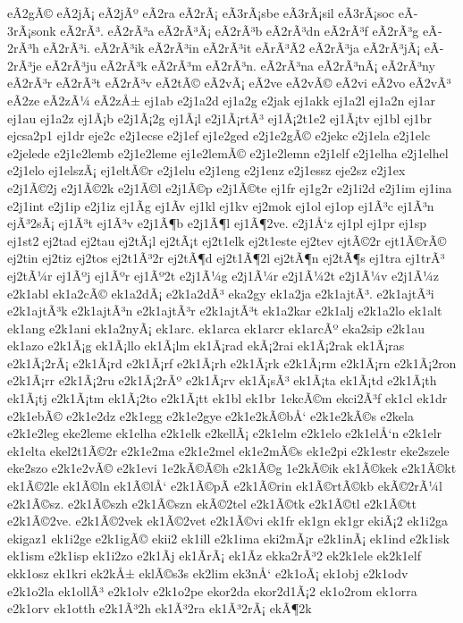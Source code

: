 {eÃ­2gÃ©
eÃ­2jÃ¡
eÃ­2jÃº
eÃ­2ra
eÃ­2rÃ¡
eÃ­3rÃ¡sbe
eÃ­3rÃ¡sil
eÃ­3rÃ¡soc
eÃ­3rÃ¡sonk
eÃ­2rÃ³.
eÃ­2rÃ³a
eÃ­2rÃ³Ã¡
eÃ­2rÃ³b
eÃ­2rÃ³dn
eÃ­2rÃ³f
eÃ­2rÃ³g
eÃ­2rÃ³h
eÃ­2rÃ³i.
eÃ­2rÃ³ik
eÃ­2rÃ³in
eÃ­2rÃ³it
eÃ­rÃ³Ã­2
eÃ­2rÃ³ja
eÃ­2rÃ³jÃ¡
eÃ­2rÃ³je
eÃ­2rÃ³ju
eÃ­2rÃ³k
eÃ­2rÃ³m
eÃ­2rÃ³n.
eÃ­2rÃ³na
eÃ­2rÃ³nÃ¡
eÃ­2rÃ³ny
eÃ­2rÃ³r
eÃ­2rÃ³t
eÃ­2rÃ³v
eÃ­2tÃ©
eÃ­2vÃ¡
eÃ­2ve
eÃ­2vÃ©
eÃ­2vi
eÃ­2vo
eÃ­2vÃ³
eÃ­2ze
eÃ­2zÃ¼
eÃ­2zÅ±
ej1ab
e2j1a2d
ej1a2g
e2jak
ej1akk
ej1a2l
ej1a2n
ej1ar
ej1au
ej1a2z
ej1Ã¡b
e2j1Ã¡2g
ej1Ã¡l
e2j1Ã¡rtÃ³
ej1Ã¡2t1e2
ej1Ã¡tv
ej1bl
ej1br
ejcsa2p1
ej1dr
eje2c
e2j1ecse
e2j1ef
ej1e2ged
e2j1e2gÃ©
e2jekc
e2j1ela
e2j1elc
e2jelede
e2j1e2lemb
e2j1e2leme
ej1e2lemÃ©
e2j1e2lemn
e2j1elf
e2j1elha
e2j1elhel
e2j1elo
ej1elszÃ¡
ej1eltÃ©r
e2j1elu
e2j1eng
e2j1enz
e2j1essz
eje2sz
e2j1ex
e2j1Ã©2j
e2j1Ã©2k
e2j1Ã©l
e2j1Ã©p
e2j1Ã©te
ej1fr
ej1g2r
e2j1i2d
e2j1im
ej1ina
e2j1int
e2j1ip
e2j1iz
ej1Ã­g
ej1Ã­v
ej1kl
ej1kv
ej2mok
ej1ol
ej1op
ej1Ã³c
ej1Ã³n
ejÃ³2sÃ¡
ej1Ã³t
ej1Ã³v
e2j1Ã¶b
e2j1Ã¶l
ej1Ã¶2ve.
e2j1Å‘z
ej1pl
ej1pr
ej1sp
ej1st2
ej2tad
ej2tau
ej2tÃ¡l
ej2tÃ¡t
ej2t1elk
ej2t1este
ej2tev
ejtÃ©2r
ejt1Ã©rÃ©
ej2tin
ej2tiz
ej2tos
ej2t1Ã³2r
ej2tÃ¶d
ej2t1Ã¶2l
ej2tÃ¶n
ej2tÃ¶s
ej1tra
ej1trÃ³
ej2tÃ¼r
ej1Ãºj
ej1Ãºr
ej1Ãº2t
e2j1Ã¼g
e2j1Ã¼r
e2j1Ã¼2t
e2j1Ã¼v
e2j1Ã¼z
e2k1abl
ek1a2cÃ©
ek1a2dÃ¡
e2k1a2dÃ³
eka2gy
ek1a2ja
e2k1ajtÃ³.
e2k1ajtÃ³i
e2k1ajtÃ³k
e2k1ajtÃ³n
e2k1ajtÃ³r
e2k1ajtÃ³t
ek1a2kar
e2k1alj
e2k1a2lo
ek1alt
ek1ang
e2k1ani
ek1a2nyÃ¡
ek1arc.
ek1arca
ek1arcr
ek1arcÃº
eka2sip
e2k1au
ek1azo
e2k1Ã¡g
ek1Ã¡llo
ek1Ã¡lm
ek1Ã¡rad
ekÃ¡2rai
ek1Ã¡2rak
ek1Ã¡ras
e2k1Ã¡2rÃ¡
e2k1Ã¡rd
e2k1Ã¡rf
e2k1Ã¡rh
e2k1Ã¡rk
e2k1Ã¡rm
e2k1Ã¡rn
e2k1Ã¡2ron
e2k1Ã¡rr
e2k1Ã¡2ru
e2k1Ã¡2rÃº
e2k1Ã¡rv
ek1Ã¡sÃ³
ek1Ã¡ta
ek1Ã¡td
e2k1Ã¡th
ek1Ã¡tj
e2k1Ã¡tm
ek1Ã¡2to
e2k1Ã¡tt
ek1bl
ek1br
1ekcÃ©m
ekci2Ã³f
ek1cl
ek1dr
e2k1ebÃ©
e2k1e2dz
e2k1egg
e2k1e2gye
e2k1e2kÃ©bÅ‘
e2k1e2kÃ©s
e2kela
e2k1e2leg
eke2leme
ek1elha
e2k1elk
e2kellÃ¡
e2k1elm
e2k1elo
e2k1elÅ‘n
e2k1elr
ek1elta
ekel2t1Ã©2r
e2k1e2ma
e2k1e2mel
ek1e2mÃ©s
ek1e2pi
e2k1estr
eke2szele
eke2szo
e2k1e2vÃ©
e2k1evi
1e2kÃ©Ã©h
e2k1Ã©g
1e2kÃ©ik
ek1Ã©kek
e2k1Ã©kt
ek1Ã©2le
ek1Ã©ln
ek1Ã©lÅ‘
e2k1Ã©pÃ­
e2k1Ã©rin
ek1Ã©rtÃ©kb
ekÃ©2rÃ¼l
e2k1Ã©sz.
e2k1Ã©szh
e2k1Ã©szn
ekÃ©2tel
e2k1Ã©tk
e2k1Ã©tl
e2k1Ã©tt
e2k1Ã©2ve.
e2k1Ã©2vek
ek1Ã©2vet
e2k1Ã©vi
ek1fr
ek1gn
ek1gr
ekiÃ¡2
ek1i2ga
ekigaz1
ek1i2ge
e2k1igÃ©
ekii2
ek1ill
e2k1ima
eki2mÃ¡r
e2k1inÃ¡
ek1ind
e2k1isk
ek1ism
e2k1isp
ek1i2zo
e2k1Ã­j
ek1Ã­rÃ¡
ek1Ã­z
ekka2rÃ³2
ek2k1ele
ek2k1elf
ekk1osz
ek1kri
ek2kÅ±
eklÃ©s3s
ek2lim
ek3nÅ‘
e2k1oÃ¡
ek1obj
e2k1odv
e2k1o2la
ek1ollÃ³
e2k1olv
e2k1o2pe
ekor2da
ekor2d1Ã¡2
ek1o2rom
ek1orra
e2k1orv
ek1otth
e2k1Ã³2h
ek1Ã³2ra
ek1Ã³2rÃ¡
ekÃ¶2k
}
